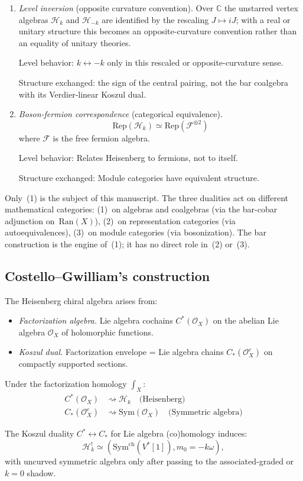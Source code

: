 \begin{enumerate}
\item \emph{Level inversion} (opposite curvature convention).
 Over $\mathbb{C}$ the unstarred vertex algebras
 $\mathcal H_k$ and $\mathcal H_{-k}$ are identified by the rescaling
 $J\mapsto iJ$; with a real or unitary structure this becomes an
 opposite-curvature convention rather than an equality of unitary
 theories.

 Level behavior: $k \leftrightarrow -k$ only in this rescaled or
 opposite-curvature sense.

 Structure exchanged: the sign of the central pairing, not the
 bar coalgebra with its Verdier-linear Koszul dual.

\item \emph{Boson-fermion correspondence} (categorical equivalence).
 \[\mathrm{Rep}(\mathcal{H}_k) \simeq \mathrm{Rep}(\mathcal{F}^{\otimes 2})\]
 where $\mathcal{F}$ is the free fermion algebra.

 Level behavior: Relates Heisenberg to fermions, not to itself.

 Structure exchanged: Module categories have equivalent structure.
\end{enumerate}

Only~(1) is the subject of this manuscript. The three dualities
act on different mathematical categories: (1)~on algebras and
coalgebras (via the bar-cobar adjunction on~$\mathrm{Ran}(X)$),
(2)~on representation categories (via autoequivalences),
(3)~on module categories (via bosonization). The bar construction
is the engine of~(1); it has no direct role in~(2) or~(3).

\subsection{Costello--Gwilliam's construction}

\begin{theorem}
\label{thm:rhagavendran-heisenberg}
The Heisenberg chiral algebra arises from:
\begin{itemize}
\item \emph{Factorization algebra.} Lie algebra cochains $C^*(\mathcal{O}_X)$ on the
 abelian Lie algebra $\mathcal{O}_X$ of holomorphic functions.
\item \emph{Koszul dual.} Factorization envelope = Lie algebra chains $C_*(\mathcal{O}_X^c)$
 on compactly supported sections.
\end{itemize}

Under the factorization homology $\int_X$:
\begin{align*}
C^*(\mathcal{O}_X) &\rightsquigarrow \mathcal{H}_k \quad \text{(Heisenberg)} \\
C_*(\mathcal{O}_X^c) &\rightsquigarrow \text{Sym}(\mathcal{O}_X) \quad \text{(Symmetric algebra)}
\end{align*}

The Koszul duality $C^* \leftrightarrow C_*$ for Lie algebra (co)homology induces:
\[
\mathcal{H}_k^!
\simeq(\mathrm{Sym}^{\mathrm{ch}}(V^*[1]),m_0=-k\omega),
\]
with uncurved symmetric algebra only after passing to the
associated-graded or \(k=0\) shadow.
\end{theorem}

